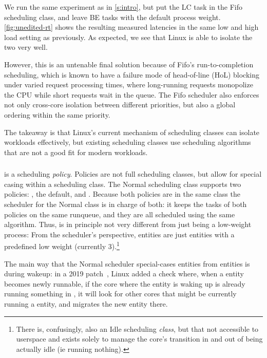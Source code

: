 We run the same experiment as in \autoref{s:intro}, but put the LC task in the
Fifo scheduling class, and leave BE tasks with the default process weight.
\autoref{fig:unedited-rt} shows the resulting measured latencies in the same low
and high load setting as previously. As expected, we see that Linux is able to
isolate the two very well. 

However, this is an untenable final solution because of Fifo's run-to-completion
scheduling, which is known to have a failure mode of head-of-line (HoL) blocking
under varied request processing times, where long-running requests monopolize
the CPU while short requests wait in the queue. The Fifo scheduler also enforces
not only cross-core isolation between different priorities, but also a global
ordering within the same priority.

The takeaway is that Linux's current mechanism of scheduling classes can isolate
workloads effectively, but existing scheduling classes use scheduling
algorithms that are not a good fit for modern workloads.

\subsubsection{\schedidle}

\schedidle{} is a scheduling \textit{policy}. Policies are not full scheduling
classes, but allow for special casing within a scheduling class. The Normal
scheduling class supports two policies: \schednormal{}, the default, and
\schedidle{}. Because both policies are in the same class the scheduler for the
Normal class is in charge of both: it keeps the tasks of both policies on the
same runqueue, and they are all scheduled using the same algorithm. Thus,
\schedidle{} is in principle not very different from just being a low-weight
process: From the scheduler's perspective, \schedidle{} entities are just
entities with a predefined low weight (currently 3).\footnote{There is,
confusingly, also an Idle scheduling \textit{class}, but that not accessible to
userspace and exists solely to manage the core's transition in and out of being
actually idle (ie running nothing).}

The main way that the Normal scheduler special-cases \schedidle{} entities from
\schednormal{} entities is during wakeup: in a 2019 patch~\cite{TODO}, Linux
added a check where, when a \schednormal{} entity becomes newly runnable, if the
core where the entity is waking up is already running something in
\schednormal{}, it will look for other cores that might be currently running a
\schedidle{} entity, and migrates the new entity there.

